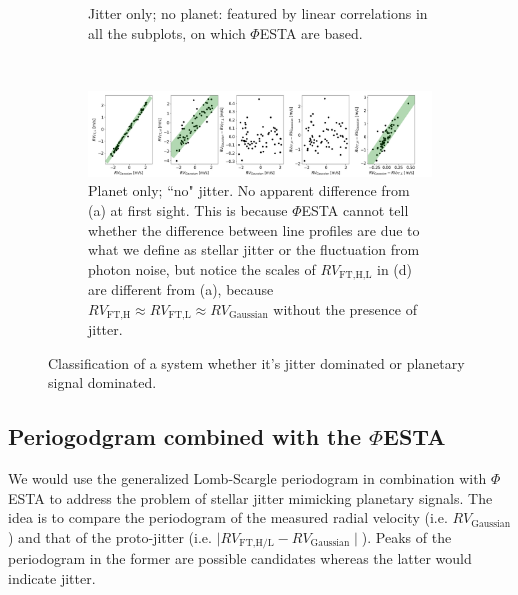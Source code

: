 \begin{figure}[htbp]
\begin{subfigure}[b]{1.0\textwidth}
        \caption{Jitter only; no planet: featured by linear correlations in all the subplots, on which $\mathit{\Phi}$ESTA are based.}
    \end{subfigure}	    
	~
    \begin{subfigure}[b]{1.0\textwidth}
        \includegraphics[width=\textwidth]{./Figures/Methods/Correlation_0jitter.png}
        \caption{Planet only; ``no" jitter. No apparent difference from (a) at first sight. This is because $\mathit{\Phi}$ESTA cannot tell whether the difference between line profiles are due to what we define as stellar jitter or the fluctuation from photon noise, but notice the scales of $RV_\text{FT,H,L}$ in (d) are different from (a), because $RV_\text{FT,H} \approx RV_\text{FT,L} \approx RV_\text{Gaussian}$ without the presence of jitter. }
    \end{subfigure}	    
    \caption[Classification of jitter dominated or planetary signal dominated]        
    {Classification of a system whether it's jitter dominated or planetary signal dominated.}
\label{fig:correlations}
\end{figure}    
\FloatBarrier


\subsection{Periogodgram combined with the $\mathit{\Phi}$ESTA}

We would use the generalized Lomb-Scargle periodogram \cite{Zechmeister2009} in combination with $\mathit{\Phi}$ESTA to address the problem of stellar jitter mimicking planetary signals. The idea is to compare the periodogram of the measured radial velocity (i.e. $RV_\text{Gaussian}$) and that of the proto-jitter (i.e. $\mid RV_\text{FT,H/L} - RV_\text{Gaussian} \mid$). Peaks of the periodogram in the former are possible candidates whereas the latter would indicate jitter. 

